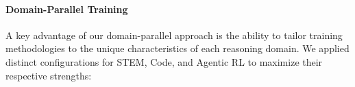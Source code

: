 
\noindent\paragraph{Domain-Parallel Training}
A key advantage of our domain-parallel approach is the ability to tailor training methodologies to the unique characteristics of each reasoning domain. 
We applied distinct configurations for STEM, Code, and Agentic RL to maximize their respective strengths:


